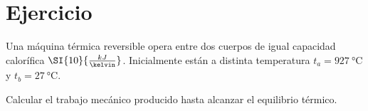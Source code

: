 \section{Ejercicio}\label{ej:Chap07Ejercicio09}
Una máquina térmica reversible opera entre dos cuerpos de igual capacidad calorífica $\SI{10}{\frac{kJ}{\kelvin}}$. Inicialmente están a distinta temperatura $t_a=\SI{927}{\celsius}$ y $t_b=\SI{27}{\celsius}$.

Calcular el trabajo mecánico producido hasta alcanzar el equilibrio térmico.